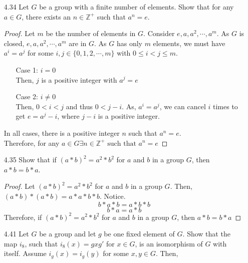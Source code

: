 \documentclass[12pt]{article}
\newcommand{\Z}{\mathds{Z}}
\begin{document}
\begin{enumerate}
\begin{proof}
				\begin{align*}
					(a*b)^{k+1} &= (a*b)*(a*b)^k\\
								&= (a*b)*(a^k*b^k)\\
								&= a*a^k*b*b^k\\
								&= a^{k+1}*b^{k+1}
				\end{align*}
				Therefore, by mathematical induction $(a * b)^n = (a^n) * (b^n)$ for all $a,b \in G$.
			\end{proof}
			\item[4.34] Let $G$ be a group with a finite number of elements. Show that for any $a \in G$, there exists an $n\in \Z^+$ such that $a^n = e$.
			\begin{proof}
				Let $ m $ be the number of elements in $ G $. Consider $ e,a,a^2,\cdots, a^m $. As $ G $ is closed,  $ e,a,a^2,\cdots, a^m $ are in $ G $. As $ G $ has only $ m $ elements, we must have $ a^i=a^j $ for some $ i,j\in\{0,1,2,\cdots,m\}  $ with $ 0\leq i < j \leq m $.
				\begin{enumerate}
					\item [Case 1:] $ i = 0 $\\
					Then, $ j $ is a positive integer with $ a^j =e $
					\item[Case 2:] $ i \not = 0 $\\
					Then, $ 0 < i < j $ and thus $ 0<j-i $. As, $ a^i = a^j $, we can cancel $ i $ times to get $ e=a^j-i $, where $ j-i $ is a positive integer.
				\end{enumerate}
				In all cases, there is a positive integer $ n $ such that $ a^n =e $.\\
				Therefore, for any $ a\in G \exists n \in \Z^+ \text{ such that } a^n =e $
			\end{proof}
			\item[4.35] Show that if $(a  * b)^2 = a^2  * b^2$ for $a$ and $b$ in a group $G$, then $a * b = b  * a$.
			\begin{proof}
				Let  $(a  * b)^2 = a^2  * b^2$ for $a$ and $b$ in a group $G$. Then, $ (a*b)*(a*b)=a*a*b*b $.
				Notice.
				\[b*a*b=a*b*b\]
				\[b*a=a*b\]
				Therefore, if $(a  * b)^2 = a^2  * b^2$ for $a$ and $b$ in a group $G$, then $a * b = b  * a$
			\end{proof} 
			\item[4.41] Let $G$ be a group and let $g$ be one fixed element of $G$. Show that the map $i_8$, such that $i_8(x) = gxg'$ for $x\in G$, is an isomorphism of $G$ with itself.
				Assume $ i_g(x) = i_g(y) $ for some $ x,y\in G $. Then, 

\end{enumerate}
\end{document}
